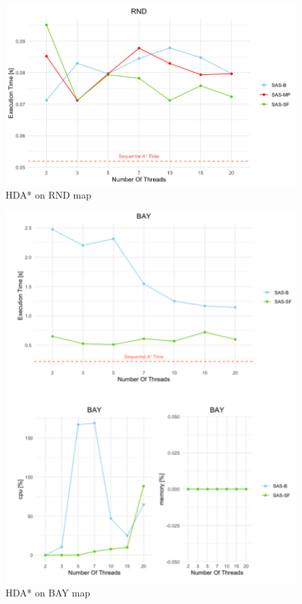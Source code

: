 \documentclass[twocolumn, switch]{article} %
\begin{document}
\begin{figure}[ht!]
  \centering
  \includegraphics[width=1\linewidth]{hda/rnd.png}
  \caption{HDA* on RND map}
  \label{hdarnd}
\end{figure}
\begin{figure}[ht!]
  \centering
  \includegraphics[width=1\linewidth]{hda/bay.png}
  \caption{HDA* on BAY map}
  \label{hdabay}
\end{figure}
\end{document}
